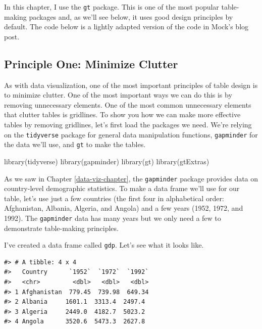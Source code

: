 \documentclass[
]{book}
\newenvironment{Shaded}{\begin{snugshade}}{\end{snugshade}}
\newcommand{\FunctionTok}[1]{\textcolor[rgb]{0.00,0.00,0.00}{#1}}
\newcommand{\NormalTok}[1]{#1}
\begin{document}
In this chapter, I use the \texttt{gt} package. This is one of the most popular table-making packages and, as we'll see below, it uses good design principles by default. The code below is a lightly adapted version of the code in Mock's blog post.

\hypertarget{principle-one-minimize-clutter}{%
\subsection*{Principle One: Minimize Clutter}\label{principle-one-minimize-clutter}}

As with data visualization, one of the most important principles of table design is to minimize clutter. One of the most important ways we can do this is by removing unnecessary elements. One of the most common unnecessary elements that clutter tables is gridlines. To show you how we can make more effective tables by removing gridlines, let's first load the packages we need. We're relying on the \texttt{tidyverse} package for general data manipulation functions, \texttt{gapminder} for the data we'll use, and \texttt{gt} to make the tables.

\begin{Shaded}
\begin{Highlighting}[]
\FunctionTok{library}\NormalTok{(tidyverse)}
\FunctionTok{library}\NormalTok{(gapminder)}
\FunctionTok{library}\NormalTok{(gt)}
\FunctionTok{library}\NormalTok{(gtExtras)}
\end{Highlighting}
\end{Shaded}

As we saw in Chapter \ref{data-viz-chapter}, the \texttt{gapminder} package provides data on country-level demographic statistics. To make a data frame we'll use for our table, let's use just a few countries (the first four in alphabetical order: Afghanistan, Albania, Algeria, and Angola) and a few years (1952, 1972, and 1992). The \texttt{gapminder} data has many years but we only need a few to demonstrate table-making principles.

I've created a data frame called \texttt{gdp}. Let's see what it looks like.

\begin{verbatim}
#> # A tibble: 4 x 4
#>   Country      `1952`  `1972`  `1992`
#>   <chr>         <dbl>   <dbl>   <dbl>
#> 1 Afghanistan  779.45  739.98  649.34
#> 2 Albania     1601.1  3313.4  2497.4 
#> 3 Algeria     2449.0  4182.7  5023.2 
#> 4 Angola      3520.6  5473.3  2627.8
\end{verbatim}
\end{document}
